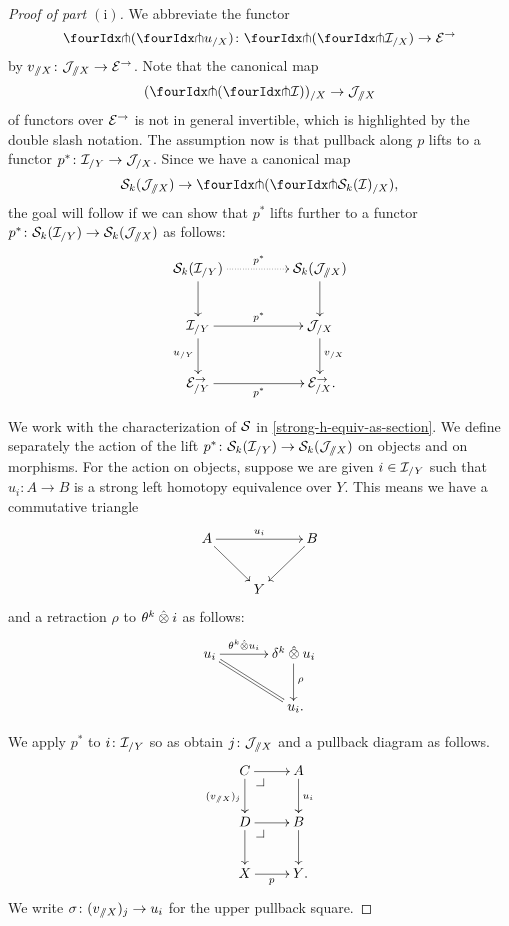 \documentclass[reqno,10pt,a4paper,oneside,draft]{amsart}
\begin{document}
\begin{proof}[Proof of part $\mathrm{(i)}$]
We abbreviate the functor
\[
\liftl{(\liftr{u_{/X}})} \co \liftl{(\liftr{\cal{I}_{/X}})} \to \catE^\to
\]
by $v_{\fakeslice X} \co \cal{J}_{\fakeslice X} \to \catE^\to$.
Note that the canonical map
\[
  (\liftl{(\liftr{\cal{I}})})_{/X} \to \cal{J}_{\fakeslice X}
\]
of functors over $\catE^\to$ is not in general invertible, which is highlighted by the double slash notation.
The assumption now is that pullback along $p$ lifts to a functor $p^* \co \cal{I}_{/Y} \to \cal{J}_{/X}$.
Since we have a canonical map
\[
\cal{S}_k(\cal{J}_{\fakeslice X}) \to \liftl{(\liftr{\cal{S}_k(\cal{I})_{/X}})}
,\]
the goal will follow if we can show that $p^*$ lifts further to a functor $p^* \co \cal{S}_k(\cal{I}_{/Y}) \to \cal{S}_k(\cal{J}_{\fakeslice X})$ as follows:
\[
\xymatrix@C+2em{
  \cal{S}_k(\cal{I}_{/Y})
  \ar@{.>}[r]^{p^*}
  \ar[d]
&
  \cal{S}_k(\cal{J}_{\fakeslice X})
  \ar[d]
\\
  \cal{I}_{/Y}
  \ar[r]^{p^*}
  \ar[d]_{u_{/Y}}
&
  \cal{J}_{/X}
  \ar[d]^{v_{/X}}
\\
  \catE_{/Y}^\to
  \ar[r]_{p^*}
&
  \catE_{/X}^\to
\rlap{.}}
\]

We work with the characterization of $\cal{S}$ in \cref{strong-h-equiv-as-section}.
We define separately the action of the lift $p^* \co \cal{S}_k(\cal{I}_{/Y}) \to \cal{S}_k(\cal{J}_{\fakeslice X})$ on objects and on morphisms.
For the action on objects, suppose we are given $i \in \cal{I}_{/Y}$ such that $u_i : A \to B$ is a strong left homotopy equivalence over $Y$.
This means we have a commutative triangle
\[
\xymatrix{
  A
  \ar[rr]^{u_i}
  \ar[dr]
&&
  B
  \ar[dl]
\\&
  Y
}
\]
and a retraction $\rho$ to $\thetak \hatotimes i$ as follows:
\[
\xymatrix@C+1em{
  u_i
  \ar[r]^-{\thetak \hatotimes u_i}
  \ar@{=}[dr]
&
  \kcyl \hatotimes u_i \ar[d]^{\rho}
\\&
  u_i
\rlap{.}}
\]

We apply $p^*$ to $i \co \cal{I}_{/Y}$ so as obtain $j \co \cal{J}_{\fakeslice X}$ and a pullback diagram as follows.
\begin{equation} \label{technical:0}
\xycenter{
  C
  \ar[r]
  \ar[d]_{(v_{\fakeslice X})_{j}}
  \pullback{dr}
&
  A
  \ar[d]^{u_i}
\\
  D
  \ar[r]
  \ar[d]
  \pullback{dr}
&
  B
  \ar[d]
\\
  X
  \ar[r]_p
&
  Y
\rlap{.}}
\end{equation}
We write $\sigma \co (v_{\fakeslice X})_{j} \to u_i$ for the upper pullback square.


\end{proof}
\end{document}
